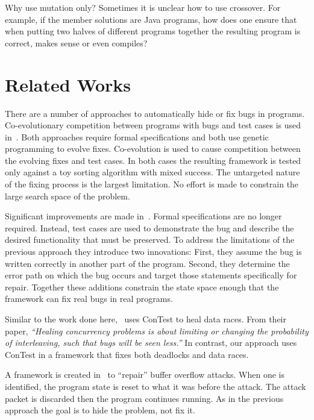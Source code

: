 \documentclass{llncs}
\begin{document}
Why use mutation only? Sometimes it is unclear how to use crossover. For
example, if the member solutions are Java programs, how does one ensure that
when putting two halves of different programs together the resulting program is
correct, makes sense or even compiles?

\section{Related Works}
\label{sec:related_works}

There are a number of approaches to automatically hide or fix bugs in programs.
Co-evolutionary competition between programs with bugs and test cases is used
in~\cite{AY08, Arc08, WT10}. Both approaches require formal specifications and
both use genetic programming to evolve fixes. Co-evolution is used to cause
competition between the evolving fixes and test cases. In both cases the
resulting framework is tested only against a toy sorting algorithm with mixed
success. The untargeted nature of the fixing process is the largest limitation.
No effort is made to constrain the large search space of the problem.

Significant improvements are made in~\cite{FNWG09, WNLF09, NWLF09, WFGN10,
GNFW11}. Formal specifications are no longer required. Instead, test cases are
used to demonstrate the bug and describe the desired functionality that must be
preserved. To address the limitations of the previous approach they introduce
two innovations: First, they assume the bug is written correctly in another
part of the program. Second, they determine the error path on which the bug
occurs and target those statements specifically for repair. Together these
additions constrain the state space enough that the framework can fix real bugs
in real programs.

Similar to the work done here,~\cite{KLT+07, LVK08} uses ConTest to heal data
races. From their paper, \textit{``Healing concurrency problems is about
limiting or changing the probability of interleaving, such that bugs will be
seen less.''} In contrast, our approach uses ConTest in a framework that fixes
both deadlocks and data races.

A framework is created in~\cite{CB05} to ``repair'' buffer overflow attacks.
When one is identified, the program state is reset to what it was before the
attack. The attack packet is discarded then the program continues running. As
in the previous approach the goal is to hide the problem, not fix it.
\end{document}
